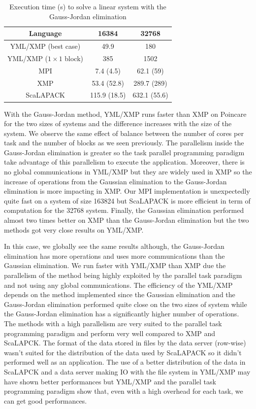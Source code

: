 \begin{table}
	\caption{Execution time (s) to solve a linear system with the Gauss-Jordan elimination\label{tab:best_time_gj}}
	\centering
	\begin{tabular}{ccc}
		\hline
         Language           &    16384     &    32768     \\ \hline
   YML/XMP (best case)      &     49.9     &     180      \\
		YML/XMP ($1 \times 1$ block) &     385      &     1502     \\
           MPI              &  7.4 (4.5)   &  62.1 (59)   \\
           XMP              & 53.4 (52.8)  & 289.7 (289)  \\
        ScaLAPACK           & 115.9 (18.5) & 632.1 (55.6) \\ \hline
	\end{tabular}
\end{table}

With the Gauss-Jordan method, YML/XMP runs faster than XMP on Poincare for the two sizes of systems and the difference increases with the size of the system.
We observe the same effect of balance between the number of cores per task and the number of blocks as we seen previously.
The parallelism inside the Gauss-Jordan elimination is greater so the task parallel programming paradigm take advantage of this parallelism to execute the application.
Moreover, there is no global communications in YML/XMP but they are widely used in XMP so the increase of operations from the Gaussian elimination to the Gauss-Jordan elimination is more impacting in XMP.
Our MPI implementation is unexpectedly quite fast on a system of size 163824 but ScaLAPACK is more efficient in term of computation for the 32768 system.
Finally, the Gaussian elimination performed almost two times better on XMP than the Gauss-Jordan elimination but the two methods got very close results on YML/XMP.

In this case, we globally see the same results although, the Gauss-Jordan elimination has more operations and uses more communications than the Gaussian elimination.
We run faster with YML/XMP than XMP due the parallelism of the method being highly exploited by the parallel task paradigm and not using any global communications.
The efficiency of the YML/XMP depends on the method implemented since the Gaussian elimination and the Gauss-Jordan elimination performed quite close on the two sizes of system while the Gauss-Jordan elimination has a significantly higher number of operations.
The methods with a high parallelism are very suited to the parallel task programming paradigm and perform very well compared to XMP and ScaLAPCK.
The format of the data stored in files by the data server (row-wise) wasn't suited for the distribution of the data used by ScaLAPACK so it didn't performed well as an application.
The use of a better distribution of the data in ScaLAPCK and a data server making IO with the file system in YML/XMP may have shown better performances but YML/XMP and the parallel task programming paradigm show that, even with a high overhead for each task, we can get good performances.


